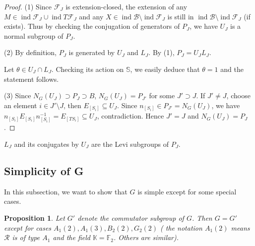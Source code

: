 \documentclass[12pt]{amsart}
\newtheorem{proposition}[theorem]{Proposition}
\begin{document}
\begin{proof}
    (1) Since $\mathcal{F}_J$ is extension-closed, the extension of any $ M \in \operatorname{ind}\mathcal{F}_J \cup \operatorname{ind}T\mathcal{F}_J$ and any $ X \in \operatorname{ind}\mathcal{B}\setminus \operatorname{ind}\mathcal{F}_J$ is still in $ \operatorname{ind}\mathcal{B}\setminus \operatorname{ind}\mathcal{F}_J$ (if exists).
    Thus by checking the conjugation of generators of $P_J$, we have $U_J$ is a normal subgroup of $P_J$.

    (2) By definition, $P_J$ is generated by $U_J$ and $L_J$. 
    By (1), $P_J = U_J L_J$.

    Let $\theta\in U_J \cap L_J$. 
    Checking its action on $\mathbb{S}$, we easily deduce that $\theta = 1$ and the statement follows.

    (3) Since $N_G(U_J) \supset P_J \supset B$, $N_G(U_J) = P_{J'}$ for some $J'\supset J$.
    If $J'\neq J$, choose an element $i\in J'\setminus J$, then $E_{[S_i]}\subseteq  U_J$.
    Since $n_{[S_i]}\in P_{J'} = N_G(U_J)$, we have $n_{[S_i]}E_{[S_i]}n_{[S_i]}^{-1} = E_{[TS_i]}\subseteq  U_J$, contradiction.
    Hence $J'=J$ and $N_G(U_J) = P_{J}$.
\end{proof}

$L_J$ and its conjugates by $U_J$ are the Levi subgroups of $P_J$.




\subsection{Simplicity of G}

In this subsection, we want to show that $G$ is simple except for some special cases.

\begin{proposition}
    Let $G'$ denote the commutator subgroup of $G$. 
    Then $G=G'$ except for cases $A_1(2),A_1(3),B_2(2),G_2(2)$ ( the notation $A_1(2)$ means $\mathcal{R}$ is of type $A_1$ and the field $\mathbb{K}=\mathbb{F}_2$. Others are similar).
\end{proposition}
\end{document}
